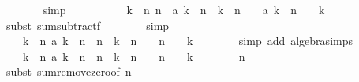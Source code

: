 \begin{isabellebody}
\ \ \ \ \ \ \isamarkupfalse%
\ simp\isanewline
\ \ \ \ \isamarkupfalse%
\ \isamarkupfalse%
\ {\isachardoublequoteopen}{\isachardot}{\isachardot}{\isachardot}\ {\isacharequal}\ {\isacharparenleft}{\isasymSum}\ k\ {\isacharless}\ n{\isachardot}\ n\ {\isacharasterisk}\ a\ k\ {\isacharslash}\ {\isacharparenleft}n\ {\isacharminus}\ k{\isacharparenright}\ {\isacharminus}\ {\isacharparenleft}n\ {\isacharplus}\ {}{\isacharparenright}\ {\isacharasterisk}\ a\ k\ {\isacharslash}\ {\isacharparenleft}n\ {\isacharplus}\ {}\ {\isacharminus}\ k{\isacharparenright}{\isacharparenright}{\isachardoublequoteclose}\isanewline
\ \ \ \ \ \ \isamarkupfalse%
\ {\isacharparenleft}subst\ sum{\isacharunderscore}subtractf{\isacharparenright}\isanewline
\ \ \ \ \ \ \isamarkupfalse%
\ simp\isanewline
\ \ \ \ \isamarkupfalse%
\ \isamarkupfalse%
\ {\isachardoublequoteopen}{\isachardot}{\isachardot}{\isachardot}\ {\isacharequal}\ {\isacharparenleft}{\isasymSum}\ k\ {\isacharless}\ n{\isachardot}\ a\ k\ {\isacharasterisk}\ {\isacharparenleft}n\ {\isacharslash}\ {\isacharparenleft}n\ {\isacharminus}\ k{\isacharparenright}\ {\isacharminus}\ {\isacharparenleft}n\ {\isacharplus}\ {}{\isacharparenright}\ {\isacharslash}\ {\isacharparenleft}n\ {\isacharplus}\ {}\ {\isacharminus}\ k{\isacharparenright}{\isacharparenright}{\isacharparenright}{\isachardoublequoteclose}\isanewline
\ \ \ \ \ \ \isamarkupfalse%
\ {\isacharparenleft}simp\ add{\isacharcolon}\ algebra{\isacharunderscore}simps{\isacharparenright}\isanewline
\ \ \ \ \isamarkupfalse%
\ \isamarkupfalse%
\ {\isachardoublequoteopen}{\isachardot}{\isachardot}{\isachardot}\ {\isacharequal}\ {\isacharparenleft}{\isasymSum}\ k\ {\isasymin}\ {\isacharbraceleft}{}{\isachardot}{\isachardot}{\isacharless}n{\isacharbraceright}{\isachardot}\ a\ k\ {\isacharasterisk}\ {\isacharparenleft}n\ {\isacharslash}\ {\isacharparenleft}n\ {\isacharminus}\ k{\isacharparenright}\ {\isacharminus}\ {\isacharparenleft}n\ {\isacharplus}\ {}{\isacharparenright}\ {\isacharslash}\ {\isacharparenleft}n\ {\isacharplus}\ {}\ {\isacharminus}\ k{\isacharparenright}{\isacharparenright}{\isacharparenright}{\isachardoublequoteclose}\isanewline
\ \ \ \ \ \ \isamarkupfalse%
\ {\isacharbackquoteopen}n\ {\isachargreater}\ {}{\isacharbackquoteclose}\isanewline
\ \ \ \ \ \ \isamarkupfalse%
\ {\isacharparenleft}subst\ sum{\isacharunderscore}remove{\isacharunderscore}zero{\isacharbrackleft}of\ {\isachardoublequoteopen}n{\isachardoublequoteclose}{\isacharbrackright}{\isacharparenright}\isanewline

\end{isabellebody}
